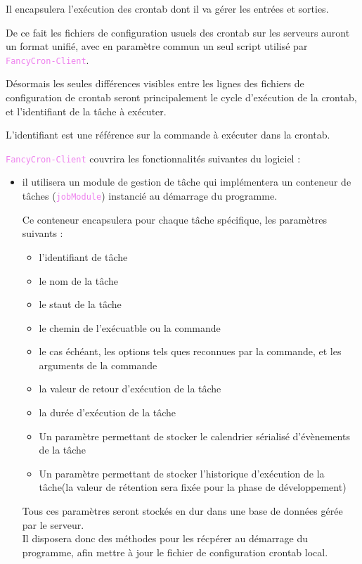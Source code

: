 \documentclass{bouygues-fr}
\begin{document}
Il encapsulera l'exécution des crontab dont il va gérer les entrées et sorties.

De ce fait les fichiers de configuration usuels des crontab sur les serveurs auront un format unifié, avec en paramètre commun un seul script utilisé par \textcolor{violet}{\texttt{FancyCron-Client}}. 

Désormais les seules différences visibles entre les lignes des fichiers de configuration de crontab seront principalement le cycle d'exécution de la crontab, et l'identifiant de la tâche à exécuter.

L'identifiant est une référence sur la commande à exécuter dans la crontab. 

\textcolor{violet}{\texttt{FancyCron-Client}} couvrira les fonctionnalités suivantes du logiciel :
\begin{itemize}
\item il utilisera un module de gestion de tâche qui implémentera un conteneur de tâches (\textcolor{violet}{\texttt{jobModule}}) instancié au démarrage du programme.
  
  Ce conteneur encapsulera pour chaque tâche spécifique, les paramètres suivants : 
  \begin{itemize}
  \item l'identifiant de tâche
  \item le nom de la tâche
  \item le staut de la tâche 
  \item le chemin de l'exécuatble ou la commande
  \item le cas échéant, les options tels ques reconnues par la commande, et les arguments de la commande
  \item la valeur de retour d'exécution de la tâche
  \item la durée d'exécution de la tâche
  \item Un paramètre permettant de stocker le calendrier sérialisé d'évènements de la tâche
  \item Un paramètre permettant de stocker l'historique d'exécution de la tâche(la valeur de rétention sera fixée pour la phase de développement)
\end{itemize}

Tous ces paramètres seront stockés en dur dans une base de données gérée par le serveur.
\\Il disposera donc des méthodes pour les récpérer au démarrage du programme, afin mettre à jour  le fichier de configuration crontab local. 


\end{itemize}
\end{document}
